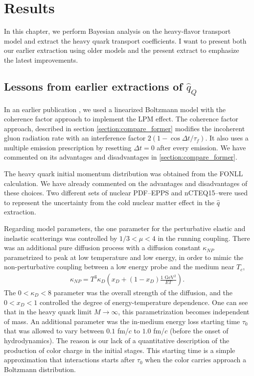 \chapter{Results}
\label{chapter:results}
In this chapter, we perform Bayesian analysis on the heavy-flavor transport model and extract the heavy quark transport coefficients.
I want to present both our earlier extraction using older models and the present extract to emphasize the latest improvements.

\section{Lessons from earlier extractions of $\hat{q}_Q$}
In an earlier publication \cite{Ke:2018tsh}, we used a linearized Boltzmann model with the coherence factor approach to implement the LPM effect.
The coherence factor approach, described in section  \ref{section:compare_former} modifies the incoherent gluon radiation rate with an interference factor $2(1-\cos\Delta t/\tau_f)$. 
It also uses a multiple emission prescription by resetting $\Delta t=0$ after every emission.
We have commented on its advantages and disadvantages in \ref{section:compare_former}.

The heavy quark initial momentum distribution was obtained from the FONLL calculation.
We have already commented on the advantages and disadvantages of these choices.
Two different sets of nuclear PDF--EPPS and nCTEQ15--were used to represent the uncertainty from the cold nuclear matter effect in the $\hat{q}$ extraction.

Regarding model parameters, the one parameter for the perturbative elastic and inelastic scatterings was controlled by $1/3 < \mu < 4$ in the running coupling. 
There was an additional pure diffusion process with a diffusion constant $\kappa_{NP}$ parametrized to peak at low temperature and low energy, in order to mimic the non-perturbative coupling between a low energy probe and the medium near $T_c$,
\begin{eqnarray}
\kappa_{NP} = T^3 \kappa_D \left(x_D + (1-x_D)\frac{1\textrm{ GeV}{}^2}{ET}\right).
\end{eqnarray}
The $0<\kappa_D<8$ parameter was the overall strength of the diffusion, and the $0<x_D<1$ controlled the degree of energy-temperature dependence.
One can see that in the heavy quark limit $M\rightarrow \infty$, this parametrization becomes independent of mass.
An additional parameter was the in-medium energy loss starting time $\tau_0$ that was allowed to vary between $0.1$ fm/$c$ to $1.0$ fm/$c$ (before the onset of hydrodynamics).
The reason is our lack of a quantitative description of the production of color charge in the initial stages.
This starting time is a simple approximation that interactions starts after $\tau_0$ when the color carries approach a Boltzmann distribution.

